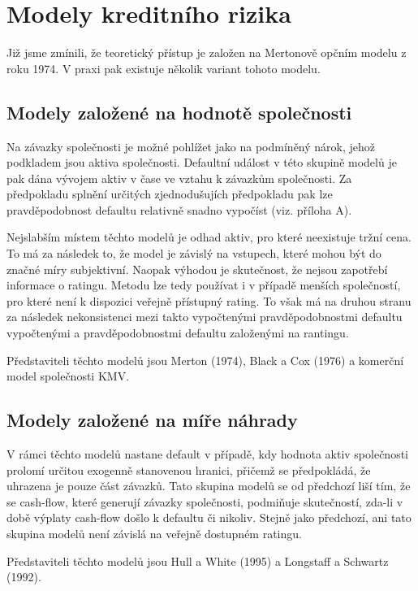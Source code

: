 \section{Modely kreditního rizika}

Již jsme zmínili, že teoretický přístup je založen na Mertonově opčním modelu z roku 1974. V praxi pak existuje několik variant tohoto modelu.

\subsection{Modely založené na hodnotě společnosti}

Na závazky společnosti je možné pohlížet jako na podmíněný nárok, jehož podkladem jsou aktiva společnosti. Defaultní událost v této skupině modelů je pak dána vývojem aktiv v čase ve vztahu k závazkům společnosti. Za předpokladu splnění určitých zjednodušujích předpokladu pak lze pravděpodobnost defaultu relativně snadno vypočíst (viz. příloha A).

Nejslabším místem těchto modelů je odhad aktiv, pro které neexistuje tržní cena. To má za následek to, že model je závislý na vstupech, které mohou být do značné míry subjektivní. Naopak výhodou je skutečnost, že nejsou zapotřebí informace o ratingu. Metodu lze tedy používat i v případě menších společností, pro které není k dispozici veřejně přístupný rating. To však má na druhou stranu za následek nekonsistenci mezi takto vypočtenými pravděpodobnostmi defaultu vypočtenými a pravděpodobnostmi defaultu založenými na rantingu.

Představiteli těchto modelů jsou Merton (1974), Black a Cox (1976) a komerční model společnosti KMV.

\subsection{Modely založené na míře náhrady}

V rámci těchto modelů nastane default v případě, kdy hodnota aktiv společnosti prolomí určitou exogenně stanovenou hranici, přičemž se předpokládá, že uhrazena je pouze část závazků. Tato skupina modelů se od předchozí liší tím, že se cash-flow, které generují závazky společnosti, podmiňuje skutečností, zda-li v době výplaty cash-flow došlo k defaultu či nikoliv. Stejně jako předchozí, ani tato skupina modelů není závislá na veřejně dostupném ratingu.

Představiteli těchto modelů jsou Hull a White (1995) a Longstaff a Schwartz (1992).

